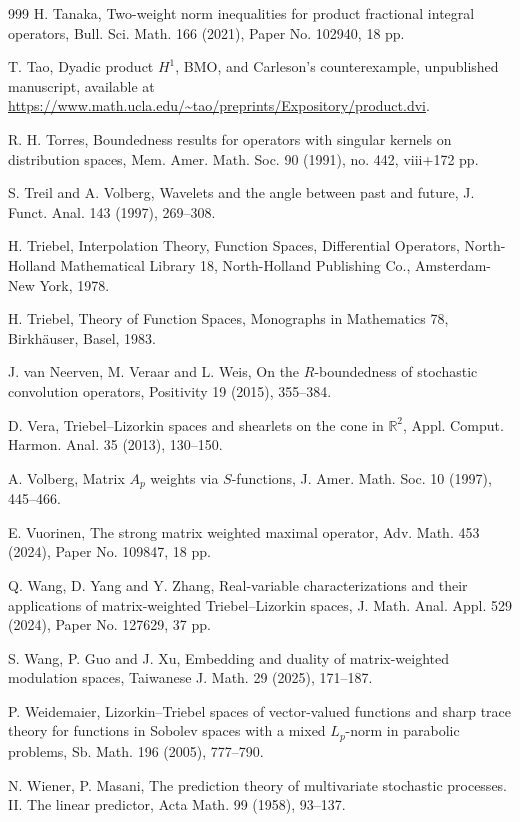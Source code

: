\documentclass[11pt, reqno]{amsart}
\theoremstyle{definition}
\theoremstyle{remark}
\numberwithin{equation}{section}
\begin{document}
\begin{thebibliography}{999}
H. Tanaka,
Two-weight norm inequalities for product fractional integral operators,
Bull. Sci. Math. 166 (2021), Paper No. 102940, 18 pp.

T. Tao,
Dyadic product $H^1$, BMO, and Carleson's counterexample,
unpublished manuscript, available at
\url{https://www.math.ucla.edu/~tao/preprints/Expository/product.dvi}.

R. H. Torres,
Boundedness results for operators with singular kernels on distribution spaces,
Mem. Amer. Math. Soc. 90 (1991), no. 442, {\rm viii}+172 pp.

S. Treil and A. Volberg,
Wavelets and the angle between past and future,
J. Funct. Anal. 143 (1997), 269--308.

H. Triebel,
Interpolation Theory, Function Spaces, Differential Operators,
North-Holland Mathematical Library 18,
North-Holland Publishing Co., Amsterdam-New York, 1978.

H. Triebel,
Theory of Function Spaces,
Monographs in Mathematics 78,
Birkh\"auser, Basel, 1983.

J. van Neerven, M. Veraar and L. Weis,
On the $R$-boundedness of stochastic convolution operators,
Positivity 19 (2015), 355--384.

D. Vera,
Triebel--Lizorkin spaces and shearlets on the cone in $\mathbb{R}^2$,
Appl. Comput. Harmon. Anal. 35 (2013), 130--150.

A. Volberg,
Matrix $A_p$ weights via $S$-functions,
J. Amer. Math. Soc. 10 (1997), 445--466.

E. Vuorinen,
The strong matrix weighted maximal operator,
Adv. Math. 453 (2024), Paper No. 109847, 18 pp.

Q. Wang, D. Yang and Y. Zhang,
Real-variable characterizations and their
applications of matrix-weighted Triebel--Lizorkin spaces,
J. Math. Anal. Appl. 529 (2024), Paper No. 127629, 37 pp.

S. Wang, P. Guo and J. Xu,
Embedding and duality of matrix-weighted modulation spaces,
Taiwanese J. Math. 29 (2025), 171--187.

P. Weidemaier,
Lizorkin--Triebel spaces of vector-valued functions and sharp trace theory for
functions in Sobolev spaces with a mixed $L_p$-norm in parabolic problems,
Sb. Math. 196 (2005), 777--790.

N. Wiener, P. Masani,
The prediction theory of multivariate stochastic processes. II. The linear predictor,
Acta Math. 99 (1958), 93--137.


\end{thebibliography}
\end{document}
